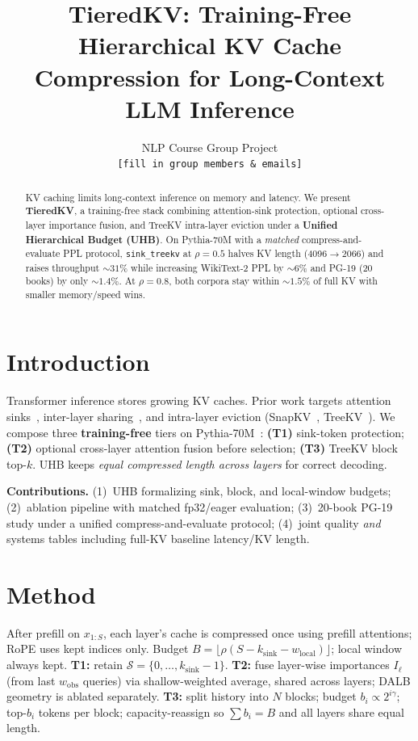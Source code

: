 \documentclass{article}
\title{TieredKV: Training-Free Hierarchical KV Cache\\Compression for Long-Context LLM Inference}
\author{%
  NLP Course Group Project \\
  \texttt{[fill in group members \& emails]}
}
\begin{document}
\maketitle

\begin{abstract}
KV caching limits long-context inference on memory and latency.
We present \textbf{TieredKV}, a training-free stack combining attention-sink protection, optional cross-layer importance fusion, and TreeKV intra-layer eviction under a \textbf{Unified Hierarchical Budget (UHB)}.
On Pythia-70M with a \emph{matched} compress-and-evaluate PPL protocol, \texttt{sink\_treekv} at $\rho{=}0.5$ halves KV length (4096$\rightarrow$2066) and raises throughput ${\sim}31\%$ while increasing WikiText-2 PPL by ${\sim}6\%$ and PG-19 (20 books) by only ${\sim}1.4\%$.
At $\rho{=}0.8$, both corpora stay within ${\sim}1.5\%$ of full KV with smaller memory/speed wins.
\end{abstract}

\section{Introduction}

Transformer inference stores growing KV caches.
Prior work targets attention sinks~\cite{xiao2024streamingllm}, inter-layer sharing~\cite{sun2024yoco}, and intra-layer eviction (SnapKV~\cite{li2024snapkv}, TreeKV~\cite{he2025treekv}).
We compose three \textbf{training-free} tiers on Pythia-70M~\cite{biderman2023pythia}:
\textbf{(T1)} sink-token protection;
\textbf{(T2)} optional cross-layer attention fusion before selection;
\textbf{(T3)} TreeKV block top-$k$.
UHB keeps \emph{equal compressed length across layers} for correct decoding.

\textbf{Contributions.}
(1)~UHB formalizing sink, block, and local-window budgets;
(2)~ablation pipeline with matched fp32/eager evaluation;
(3)~20-book PG-19 study under a unified compress-and-evaluate protocol;
(4)~joint quality \emph{and} systems tables including full-KV baseline latency/KV length.

\section{Method}

After prefill on $x_{1:S}$, each layer's cache is compressed once using prefill attentions; RoPE uses kept indices only.
Budget $B=\lfloor\rho(S-k_{\mathrm{sink}}-w_{\mathrm{local}})\rfloor$; local window always kept.
\textbf{T1:} retain $\mathcal{S}=\{0,\ldots,k_{\mathrm{sink}}-1\}$.
\textbf{T2:} fuse layer-wise importances $I_\ell$ (from last $w_{\mathrm{obs}}$ queries) via shallow-weighted average, shared across layers; DALB geometry is ablated separately.
\textbf{T3:} split history into $N$ blocks; budget $b_i\propto 2^{i\gamma}$; top-$b_i$ tokens per block; capacity-reassign so $\sum b_i=B$ and all layers share equal length.
\end{document}

